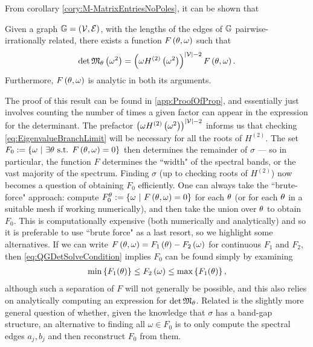 From corollary \ref{cory:M-MatrixEntriesNoPoles}, it can be shown that
\begin{prop} \label{prop:MMatrixDetForm}
	Given a graph $\mathbb{G} = \left( \mathcal{V}, \mathcal{E} \right)$, with the lengths of the edges of $\mathbb{G}$ pairwise-irrationally related, there exists a function $F\left( \theta,\omega \right)$ such that
	\begin{align} \label{eq:MMatrixDetForm}
		\det\mathfrak{M}_\theta\left( \omega^2 \right) = \left(  \omega H^{(2)}\left( \omega^2 \right)  \right)^{\left\lvert \mathcal{V} \right\rvert-2} F\left( \theta,\omega \right).
	\end{align}
	Furthermore, $F\left( \theta,\omega \right)$ is analytic in both its arguments.
\end{prop}
The proof of this result can be found in \ref{app:ProofOfProp}, and essentially just involves counting the number of times a given factor can appear in the expression for the determinant.
The prefactor $\left(  \omega H^{(2)}\left( \omega^2 \right)  \right)^{\left\lvert \mathcal{V} \right\rvert-2}$ informs us that checking \eqref{eq:EigenvalueBranchLimit} will be necessary for all the roots of $H^{(2)}$.
The set $F_0 := \left\{ \omega \ \middle\vert \  \exists\theta \text{ s.t. }F\left( \theta, \omega \right)=0 \right\}$ then determines the remainder of $\sigma$ --- so in particular, the function $F$ determines the ``width" of the spectral bands, or the vast majority of the spectrum.
Finding $\sigma$ (up to checking roots of $H^{(2)}$) now becomes a question of obtaining $F_0$ efficiently.
One can always take the ``brute-force" approach: compute $F_0^{\theta} := \left\{ \omega \ \middle\vert \  F\left( \theta, \omega \right)=0 \right\}$ for each $\theta$ (or for each $\theta$ in a suitable mesh if working numerically), and then take the union over $\theta$ to obtain $F_0$.
This is computationally expensive (both numerically and analytically) and so it is preferable to use ``brute force" as a last resort, so we highlight some alternatives.
If we can write $F\left( \theta,\omega \right) = F_1\left( \theta \right) - F_2\left( \omega \right)$ for continuous $F_1$ and $F_2$, then \eqref{eq:QGDetSolveCondition} implies $F_0$ can be found simply by examining
\begin{align*}
	\min\left\{ F_1(\theta) \right\} \leq F_2\left( \omega \right) \leq \max\left\{ F_1(\theta) \right\},
\end{align*} 
although such a separation of $F$ will not generally be possible, and this also relies on analytically computing an expression for $\det\mathfrak{M}_\theta$.
Related is the slightly more general question of whether, given the knowledge that $\sigma$ has a band-gap structure, an alternative to finding all $\omega\in F_0$ is to only compute the spectral edges $a_j, b_j$ and then reconstruct $F_0$ from them.
